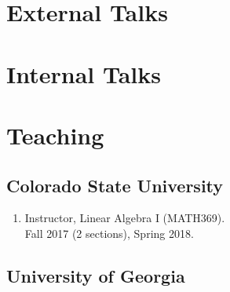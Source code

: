 \documentclass[letterpaper]{article}
\begin{document}
\section*{External Talks}

\nocite{*}
\printbibliography[heading=none,subtype=external,resetnumbers=true]

\section*{Internal Talks}

\nocite{*}
\printbibliography[heading=none,subtype=internal]

\section*{Teaching}

\subsection*{Colorado State University}

\begin{enumerate}
\item Instructor, Linear Algebra I (MATH369). \\
  Fall 2017 (2 sections), Spring 2018.
\end{enumerate}

\subsection*{University of Georgia}
\end{document}
